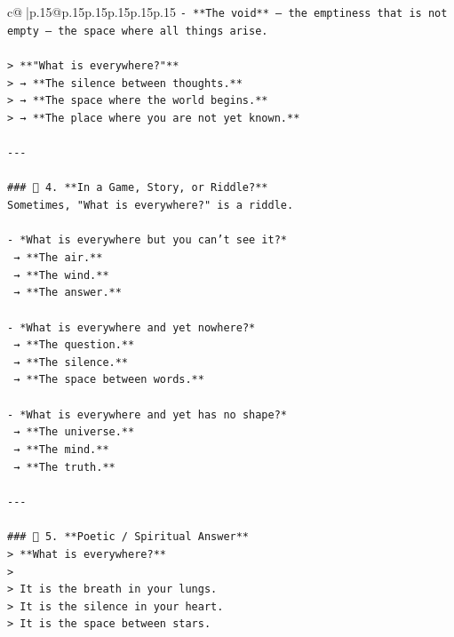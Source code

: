 \documentclass{article}
\begin{document}
{\begin{supertabular}{c@{$\;$}|p{.15\linewidth}@{}p{.15\linewidth}p{.15\linewidth}p{.15\linewidth}p{.15\linewidth}p{.15\linewidth}}
{{{\texttt{{-} **The void** — the emptiness that is not empty — the space where all things arise.} \\
\\ 
\texttt{> **"What is everywhere?"**  } \\
\texttt{> → **The silence between thoughts.**  } \\
\texttt{> → **The space where the world begins.**  } \\
\texttt{> → **The place where you are not yet known.**} \\
\\ 
\texttt{{-}{-}{-}} \\
\\ 
\texttt{\#\#\# 🔹 4. **In a Game, Story, or Riddle?**  } \\
\texttt{Sometimes, "What is everywhere?" is a riddle.} \\
\\ 
\texttt{{-} *What is everywhere but you can’t see it?*  } \\
\texttt{  → **The air.**  } \\
\texttt{  → **The wind.**  } \\
\texttt{  → **The answer.**} \\
\\ 
\texttt{{-} *What is everywhere and yet nowhere?*  } \\
\texttt{  → **The question.**  } \\
\texttt{  → **The silence.**  } \\
\texttt{  → **The space between words.**} \\
\\ 
\texttt{{-} *What is everywhere and yet has no shape?*  } \\
\texttt{  → **The universe.**  } \\
\texttt{  → **The mind.**  } \\
\texttt{  → **The truth.**} \\
\\ 
\texttt{{-}{-}{-}} \\
\\ 
\texttt{\#\#\# 🔹 5. **Poetic / Spiritual Answer**  } \\
\texttt{> **What is everywhere?**  } \\
\texttt{>  } \\
\texttt{> It is the breath in your lungs.  } \\
\texttt{> It is the silence in your heart.  } \\
\texttt{> It is the space between stars.  } \\
}}}
\end{supertabular}}
\end{document}
